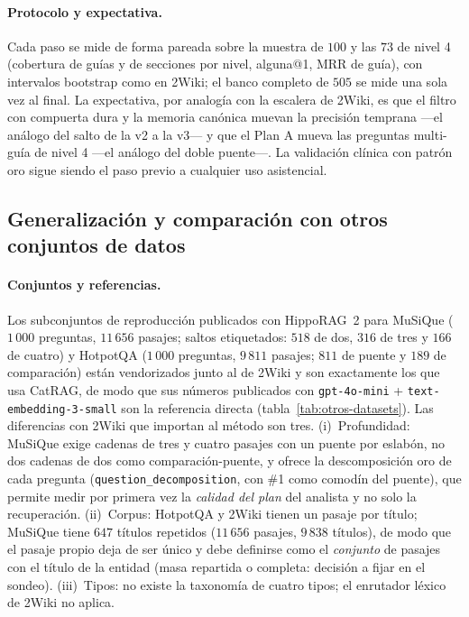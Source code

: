 \documentclass[11pt,a4paper]{article}
\newcommand{\hippo}{HippoRAG~2}
\begin{document}
\paragraph{Protocolo y expectativa.}
Cada paso se mide de forma pareada sobre la muestra de $100$ y las $73$
de nivel 4 (cobertura de guías y de secciones por nivel, alguna@1, MRR de
guía), con intervalos bootstrap como en 2Wiki; el banco completo de
$505$ se mide una sola vez al final. La expectativa, por analogía con la
escalera de 2Wiki, es que el filtro con compuerta dura y la memoria
canónica muevan la precisión temprana ---el análogo del salto de la v2 a
la v3--- y que el Plan A mueva las preguntas multi-guía de nivel 4 ---el
análogo del doble puente---. La validación clínica con patrón oro sigue
siendo el paso previo a cualquier uso asistencial.

\subsection{Generalización y comparación con otros conjuntos de datos}
\label{sec:generalizacion}

\paragraph{Conjuntos y referencias.}
Los subconjuntos de reproducción publicados con \hippo{} para MuSiQue
($1\,000$ preguntas, $11\,656$ pasajes; saltos etiquetados: $518$ de dos,
$316$ de tres y $166$ de cuatro) y HotpotQA ($1\,000$ preguntas, $9\,811$
pasajes; $811$ de puente y $189$ de comparación) están vendorizados junto
al de 2Wiki y son exactamente los que usa CatRAG, de modo que sus números
publicados con \texttt{gpt-4o-mini} + \texttt{text-embedding-3-small}
son la referencia directa (tabla~\ref{tab:otros-datasets}). Las
diferencias con 2Wiki que importan al método son tres. (i)~Profundidad:
MuSiQue exige cadenas de tres y cuatro pasajes con un puente por
eslabón, no dos cadenas de dos como comparación-puente, y ofrece la
descomposición oro de cada pregunta (\texttt{question\_decomposition},
con \guillemotleft{}\#1\guillemotright{} como comodín del puente), que permite medir por primera
vez la \emph{calidad del plan} del analista y no solo la recuperación.
(ii)~Corpus: HotpotQA y 2Wiki tienen un pasaje por título; MuSiQue tiene
$647$ títulos repetidos ($11\,656$ pasajes, $9\,838$ títulos), de modo que
el pasaje propio deja de ser único y debe definirse como el
\emph{conjunto} de pasajes con el título de la entidad (masa repartida o
completa: decisión a fijar en el sondeo). (iii)~Tipos: no existe la
taxonomía de cuatro tipos; el enrutador léxico de 2Wiki no aplica.
\end{document}

